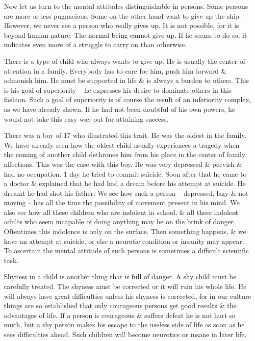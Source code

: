 \documentclass{article}
\begin{document}
Now let us turn to the mental attitudes distinguishable in persons. Some persons are more or less pugnacious. Some on the other hand want to give up the ship. However, we never see a person who really gives up. It is not possible, for it is beyond human nature. The normal being cannot give up. If he seems to do so, it indicates even more of a struggle to carry on than otherwise.

There is a type of child who always wants to give up. He is usually the center of attention in a family. Everybody has to care for him, push him forward \& admonish him. He must be supported in life \& is always a burden to others. This is his goal of superiority -- he expresses his desire to dominate others in this fashion. Such a goal of superiority is of course the result of an inferiority complex, as we have already shown. If he had not been doubtful of his own powers, he would not take this easy way out for attaining success.

There was a boy of 17 who illustrated this trait. He was the oldest in the family. We have already seen how the oldest child usually experiences a tragedy when the coming of another child dethrones him from his place in the center of family affections. This was the case with this boy. He was very depressed \& peevish \& had no occupation. 1 day he tried to commit suicide. Soon after that he came to a doctor \& explained that he had had a dream before his attempt at suicide. He dreamt he had shot his father. We see how such a person -- depressed, lazy \& not moving -- has all the time the possibility of movement present in his mind. We also see how all these children who are indolent in school, \& all these indolent adults who seem incapable of doing anything may be on the brink of danger. Oftentimes this indolence is only on the surface. Then something happens, \& we have an attempt at suicide, or else a neurotic condition or insanity may appear. To ascertain the mental attitude of such persons is sometimes a difficult scientific task.

Shyness in a child is another thing that is full of danger. A shy child must be carefully treated. The shyness must be corrected or it will ruin his whole life. He will always have great difficulties unless his shyness is corrected, for in our culture things are so established that only courageous persons get good results \& the advantages of life. If a person is courageous \& suffers defeat he is not hurt so much, but a shy person makes his escape to the useless side of life as soon as he sees difficulties ahead. Such children will become neurotics or insane in later life.
\end{document}
